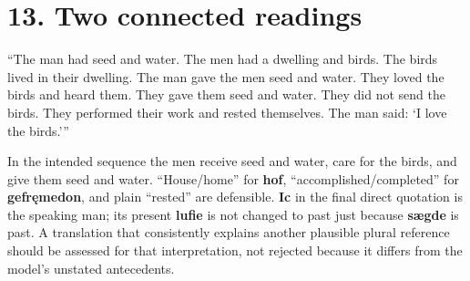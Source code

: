 \section*{13. Two connected readings}

\par\begin{minipage}{\linewidth}\raggedright

“The man had seed and water. The men had a dwelling and birds. The birds lived in their dwelling. The man gave the men seed and water. They loved the birds and heard them. They gave them seed and water. They did not send the birds. They performed their work and rested themselves. The man said: ‘I love the birds.’”

In the intended sequence the men receive seed and water, care for the birds, and give them seed and water. “House/\allowbreak{}home” for \textbf{hof}, “accomplished/\allowbreak{}completed” for \textbf{gefręmedon}, and plain “rested” are defensible. \textbf{Ic} in the final direct quotation is the speaking man; its present \textbf{lufie} is not changed to past just because \textbf{sægde} is past. A translation that consistently explains another plausible plural reference should be assessed for that interpretation, not rejected because it differs from the model’s unstated antecedents.

\end{minipage}\par\addvspace{4pt}


